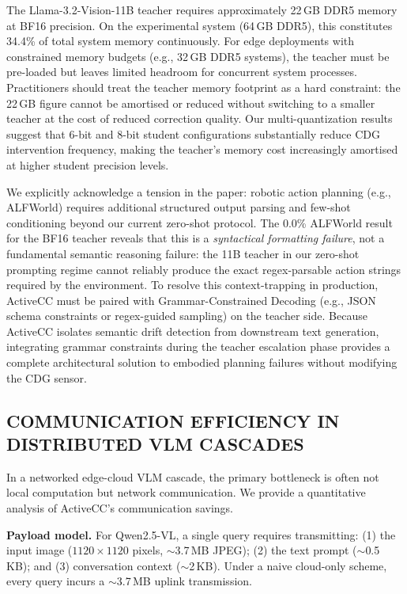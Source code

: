 \documentclass{ieeetmlcn}
\begin{document}
The Llama-3.2-Vision-11B teacher requires approximately 22\,GB DDR5 memory at BF16 precision. On the experimental system (64\,GB DDR5), this constitutes 34.4\% of total system memory continuously. For edge deployments with constrained memory budgets (e.g., 32\,GB DDR5 systems), the teacher must be pre-loaded but leaves limited headroom for concurrent system processes. Practitioners should treat the teacher memory footprint as a hard constraint: the 22\,GB figure cannot be amortised or reduced without switching to a smaller teacher at the cost of reduced correction quality. Our multi-quantization results suggest that 6-bit and 8-bit student configurations substantially reduce CDG intervention frequency, making the teacher's memory cost increasingly amortised at higher student precision levels.

We explicitly acknowledge a tension in the paper: robotic action planning (e.g., ALFWorld) requires additional structured output parsing and few-shot conditioning beyond our current zero-shot protocol. The 0.0\% ALFWorld result for the BF16 teacher reveals that this is a \emph{syntactical formatting failure}, not a fundamental semantic reasoning failure: the 11B teacher in our zero-shot prompting regime cannot reliably produce the exact regex-parsable action strings required by the environment. To resolve this context-trapping in production, ActiveCC must be paired with Grammar-Constrained Decoding (e.g., JSON schema constraints or regex-guided sampling) on the teacher side. Because ActiveCC isolates semantic drift detection from downstream text generation, integrating grammar constraints during the teacher escalation phase provides a complete architectural solution to embodied planning failures without modifying the CDG sensor.

\subsection{COMMUNICATION EFFICIENCY IN DISTRIBUTED VLM CASCADES}
\label{sec:comms}
In a networked edge-cloud VLM cascade, the primary bottleneck is often not local computation but network communication. We provide a quantitative analysis of ActiveCC's communication savings.

\textbf{Payload model.} For Qwen2.5-VL, a single query requires transmitting: (1) the input image ($1120 \times 1120$ pixels, $\sim$3.7\,MB JPEG); (2) the text prompt ($\sim$0.5\,KB); and (3) conversation context ($\sim$2\,KB). Under a naive cloud-only scheme, every query incurs a $\sim$3.7\,MB uplink transmission.
\end{document}
